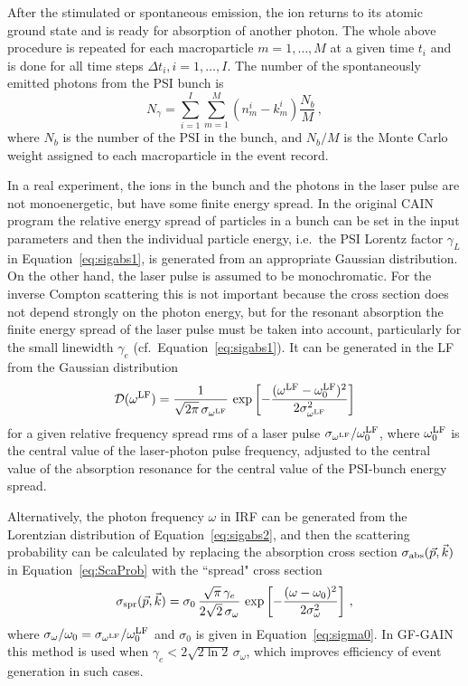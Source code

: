 After the stimulated or spontaneous emission, the ion returns to its atomic ground state and is ready for absorption of another photon.  The whole above procedure is repeated for each macroparticle $m = 1,\ldots, M$ at a given time $t_i$ and is done for all time steps $\Delta t_i, i = 1,\ldots,I$.  The number of the spontaneously emitted photons from the PSI bunch is
\begin{equation}
    N_{\gamma} = \sum_{i=1}^I \sum_{m=1}^M \left(n_m^i - k_m^i\right) \frac{N_b}{M}\,,
    \label{eq:Ngam}
\end{equation}
where $N_b$ is the number of the PSI in the bunch, and $N_b/M$ is the Monte Carlo weight assigned to each macroparticle in the event record.

In a real experiment, the ions in the bunch and the photons in the laser pulse are not monoenergetic, but have some finite energy spread.  In the original {\sf CAIN} program the relative energy spread of particles in a bunch can be set in the input parameters and then the individual particle energy, i.e.\ the PSI Lorentz factor $\gamma_L$ in Equation~\ref{eq:sigabs1}, is generated from an appropriate Gaussian distribution.  On the other hand, the laser pulse  is assumed to be monochromatic.  For the inverse Compton scattering this is not important because the cross section does not depend strongly on the photon energy, but for the resonant absorption the finite energy spread of the laser pulse must be taken into account, particularly for the small linewidth $\gamma_e$ (cf.\ Equation~\ref{eq:sigabs1}).  It can be generated in the LF from the Gaussian distribution 
\begin{equation}
    \mathcal{D}(\omega^{\rm LF}) = \frac{1}{\sqrt{2\pi}\,\sigma_{\omega^{\rm LF}}}\,
    \exp\left[-\frac{(\omega^{\rm LF}-\omega_0^{\rm LF})^2}{2\sigma_{\omega^{\rm LF}}^2}\right]
    \label{eq:LasEspread}
\end{equation}
for a given relative frequency spread rms of a laser pulse $\sigma_{\omega^{\rm LF}}/\omega^{\rm LF}_0$, where $\omega^{\rm LF}_0$ is the central value of the laser-photon pulse frequency, adjusted to the central value of the absorption resonance for the central value of the PSI-bunch energy spread.
 
Alternatively, the photon frequency $\omega$ in IRF can be generated from the Lorentzian distribution of Equation~\ref{eq:sigabs2}, and then the scattering probability can be calculated by replacing the absorption cross section $\sigma_{\rm abs}(\vec{p},\vec{k})$ in Equation~\ref{eq:ScaProb} with the ``spread" cross section
\begin{equation}
    \sigma_{\rm spr}(\vec{p},\vec{k}) = \sigma_0\, \frac{\sqrt{\pi}\,\gamma_e}{2\sqrt{2}\,\sigma_{\omega}}\,
    \exp\left[-\frac{(\omega - \omega_0)^2}{2\sigma_{\omega}^2}\right]\,,
    \label{eq:GaussXsec}
\end{equation}
where $\sigma_{\omega}/\omega_0 = \sigma_{\omega^{\rm LF}}/\omega^{\rm LF}_0$ and $\sigma_0$ is given in Equation~\ref{eq:sigma0}.  In {\sf GF-GAIN} this method is used when $\gamma_e < 2\sqrt{2\ln 2}\,\sigma_{\omega}$,
which improves efficiency of event generation in such cases.  

